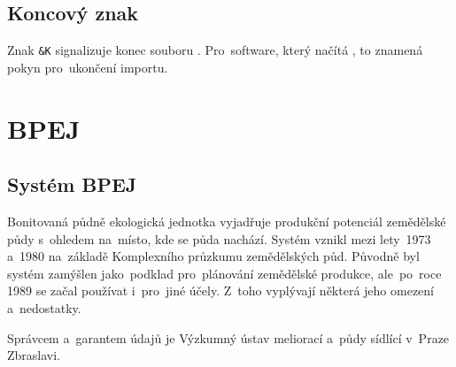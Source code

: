 
\subsection{Koncový znak}
\label{koncovy_znak}

Znak \texttt{\&K} signalizuje konec souboru . Pro~software, který načítá , to znamená pokyn pro~ukončení importu.

\section{BPEJ}
\label{bpej}

\subsection{Systém BPEJ}
\label{system_bpej}

Bonitovaná půdně ekologická jednotka vyjadřuje produkční potenciál zemědělské půdy s~ohledem na~místo, kde se půda nachází. Systém  vznikl mezi lety~1973 a~1980 na~základě Komplexního průzkumu zemědělských půd. Původně byl systém  zamýšlen jako~podklad pro~plánování zemědělské produkce, ale~po~roce 1989 se začal používat i~pro~jiné účely. Z~toho vyplývají některá jeho omezení a~nedostatky.

Správcem a~garantem údajů  je Výzkumný ústav meliorací a~půdy sídlící v~Praze Zbraslavi.

